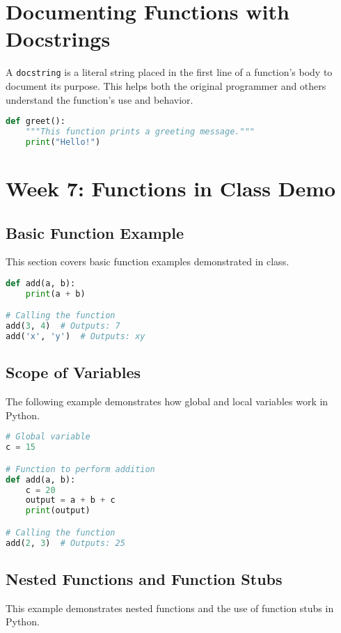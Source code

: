 \documentclass{article}
\begin{document}
\section{Documenting Functions with Docstrings}

A \lstinline|docstring| is a literal string placed in the first line of a function's body to document its purpose. This helps both the original programmer and others understand the function's use and behavior.

\begin{lstlisting}[language=Python, caption={Docstring Example}]
def greet():
    """This function prints a greeting message."""
    print("Hello!")
\end{lstlisting}



\section{Week 7: Functions in Class Demo}

\subsection{Basic Function Example}
This section covers basic function examples demonstrated in class.

\begin{lstlisting}[language=Python, caption={Basic Addition Function}]
def add(a, b):
    print(a + b)

# Calling the function
add(3, 4)  # Outputs: 7
add('x', 'y')  # Outputs: xy
\end{lstlisting}

\subsection{Scope of Variables}
The following example demonstrates how global and local variables work in Python.

\begin{lstlisting}[language=Python, caption={Variable Scope Example}]
# Global variable
c = 15

# Function to perform addition
def add(a, b):
    c = 20
    output = a + b + c
    print(output)

# Calling the function
add(2, 3)  # Outputs: 25
\end{lstlisting}

\subsection{Nested Functions and Function Stubs}
This example demonstrates nested functions and the use of function stubs in Python.
\end{document}
